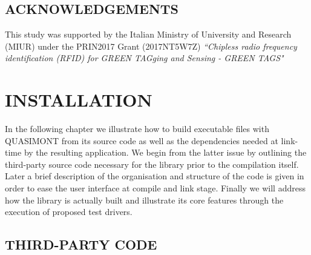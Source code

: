 \documentclass[a4paper, twosided]{book}
\begin{document}
 \section[Acknowledgements]{\changefont ACKNOWLEDGEMENTS}\label{Sec1.3}

\noindent
This study was supported by the Italian Ministry of University and Research (MIUR) under the PRIN2017 Grant (2017NT5W7Z) \textsl{“Chipless radio frequency identification (RFID) for GREEN TAGging and Sensing - GREEN TAGS"} 

\chapter[Installation]{\Huge \ttfamily INSTALLATION}

In the following chapter we illustrate how to build executable files with QUASIMONT from its source code as well as the dependencies needed at link-time by the resulting application. We begin from the latter issue by outlining the third-party source code necessary for the library prior to the compilation itself. Later a brief description of the organisation and structure of the code is given in order to ease the user interface at compile and link stage. Finally we will address how the library is actually built and illustrate its core features through the execution of proposed test drivers.

\section[Third-party code]{\changefont THIRD-PARTY CODE}\label{Sec2.1}
\end{document}
